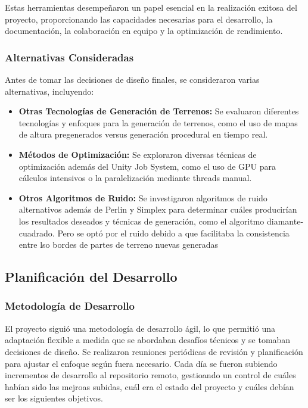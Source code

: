 Estas herramientas desempeñaron un papel esencial en la realización exitosa del proyecto, proporcionando las capacidades necesarias para el desarrollo, la documentación, la colaboración en equipo y la optimización de rendimiento.

\subsubsection{Alternativas Consideradas}
Antes de tomar las decisiones de diseño finales, se consideraron varias alternativas, incluyendo:

\begin{itemize}
    \item \textbf{Otras Tecnologías de Generación de Terrenos:} Se evaluaron diferentes tecnologías y enfoques para la generación de terrenos, como el uso de mapas de altura pregenerados versus generación procedural en tiempo real.
    
    \item \textbf{Métodos de Optimización:} Se exploraron diversas técnicas de optimización además del Unity Job System, como el uso de GPU para cálculos intensivos o la paralelización mediante threads manual.
    
    \item \textbf{Otros Algoritmos de Ruido:} Se investigaron algoritmos de ruido alternativos además de Perlin y Simplex para determinar cuáles producirían los resultados deseados y técnicas de generación, como el algoritmo diamante-cuadrado. Pero se optó por el ruido debido a que facilitaba la consistencia entre lso bordes de partes de terreno nuevas generadas
\end{itemize}

\subsection{Planificación del Desarrollo}

\subsubsection{Metodología de Desarrollo}
El proyecto siguió una metodología de desarrollo ágil, lo que permitió una adaptación flexible a medida que se abordaban desafíos técnicos y se tomaban decisiones de diseño. Se realizaron reuniones periódicas de revisión y planificación para ajustar el enfoque según fuera necesario. Cada día se fueron subiendo incrementos de desarrollo al repositorio remoto, gestioando un control de cuáles habían sido las mejroas subidas, cuál era el estado del proyecto y cuáles debían ser los siguientes objetivos.

